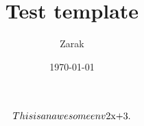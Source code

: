 \documentclass[a4paper]{article}
\title{Test template}
\author{Zarak}
\date{\today}
\theoremstyle{definition}
\begin{document}
\maketitle
  \begin{equation}
    This is an awesome env $2x+3$.
  \end{equation}
\end{document}
